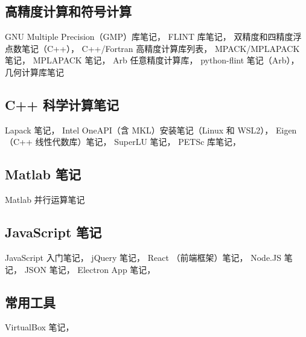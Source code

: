 \subsection{高精度计算和符号计算}
GNU Multiple Precision（GMP）库笔记，
FLINT 库笔记，
双精度和四精度浮点数笔记（C++），
C++/Fortran 高精度计算库列表，
MPACK/MPLAPACK 笔记，
MPLAPACK 笔记，
Arb 任意精度计算库，
python-flint 笔记（Arb），
几何计算库笔记

\subsection{C++ 科学计算笔记}
Lapack 笔记，
Intel OneAPI（含 MKL）安装笔记（Linux 和 WSL2），
Eigen （C++ 线性代数库）笔记，
SuperLU 笔记，
PETSc 库笔记，

\subsection{Matlab 笔记}
Matlab 并行运算笔记

\subsection{JavaScript 笔记}
JavaScript 入门笔记，
jQuery 笔记，
React （前端框架）笔记，
Node.JS 笔记，
JSON 笔记，
Electron App 笔记，

\subsection{常用工具}
VirtualBox 笔记，

